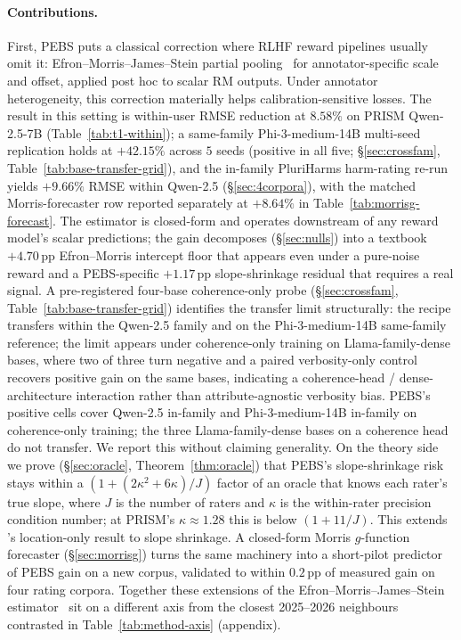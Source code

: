 \documentclass{article}
\newcommand{\PEBS}{\textsc{PEBS}}
\begin{document}
\paragraph{Contributions.}
First, \PEBS{} puts a classical correction where RLHF reward
pipelines usually omit it: Efron--Morris--James--Stein partial
pooling~\citep{efron1973stein} for annotator-specific scale and
offset, applied post hoc to scalar RM outputs. Under annotator
heterogeneity, this correction materially helps calibration-sensitive
losses. The result in this setting is within-user RMSE reduction at
$8.58\%$ on PRISM Qwen-2.5-7B
(Table~\ref{tab:t1-within}); a same-family Phi-3-medium-14B
multi-seed replication holds at $+42.15\%$ across $5$ seeds
(positive in all five; \S\ref{sec:crossfam},
Table~\ref{tab:base-transfer-grid}), and the in-family PluriHarms
harm-rating re-run yields ${+}9.66\%$ RMSE within Qwen-2.5
(\S\ref{sec:4corpora}), with the matched Morris-forecaster row
reported separately at ${+}8.64\%$ in
Table~\ref{tab:morrisg-forecast}. The estimator is closed-form and operates
downstream of any reward model's scalar predictions; the gain
decomposes (\S\ref{sec:nulls}) into a textbook $+4.70$\,pp
Efron--Morris intercept floor that appears even under a pure-noise
reward and a \PEBS{}-specific $+1.17$\,pp slope-shrinkage residual
that requires a real signal.
A pre-registered four-base coherence-only probe
(\S\ref{sec:crossfam}, Table~\ref{tab:base-transfer-grid}) identifies
the transfer limit structurally: the recipe transfers within the
Qwen-2.5 family and on the Phi-3-medium-14B same-family reference;
the limit appears under coherence-only training on
Llama-family-dense bases, where two of three turn negative and a
paired verbosity-only control recovers positive gain on the
same bases, indicating a coherence-head /
dense-architecture interaction rather than attribute-agnostic
verbosity bias. PEBS's positive cells cover Qwen-2.5 in-family
and Phi-3-medium-14B in-family on coherence-only training; the
three Llama-family-dense bases on a coherence head do not transfer.
We report this without claiming generality. On the theory side we prove
(\S\ref{sec:oracle}, Theorem~\ref{thm:oracle}) that PEBS's
slope-shrinkage risk stays within a
$(1{+}(2\kappa^2{+}6\kappa)/J)$ factor of an oracle that knows each
rater's true slope, where $J$ is the number of raters and $\kappa$ is
the within-rater precision condition number; at PRISM's
$\kappa{\approx}1.28$ this is below $(1{+}11/J)$. This extends
\citet{xie2012sure}'s location-only result to slope shrinkage. A
closed-form Morris $g$-function forecaster
(\S\ref{sec:morrisg}) turns the same machinery into a short-pilot
predictor of PEBS gain on a new corpus, validated to within
$0.2$\,pp of measured gain on four rating corpora. Together these
extensions of the Efron--Morris--James--Stein
estimator~\citep{efron1973stein,morris1983parametric,henderson1975best}
sit on a different axis from the closest 2025--2026 neighbours
contrasted in Table~\ref{tab:method-axis} (appendix).
\end{document}
